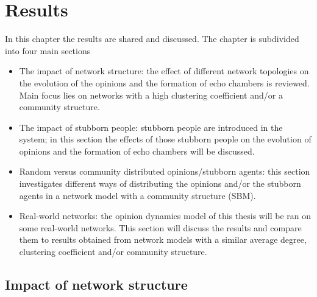 \documentclass[11 pt , letterpaper , twoside , openright]{book}
\begin{document}
\chapter{Results}

In this chapter the results are shared and discussed. The chapter is subdivided into four main sections
\begin{itemize}
	\item The impact of network structure: the effect of different network topologies on the evolution of the opinions and the formation of echo chambers is reviewed. Main focus lies on networks with a high clustering coefficient and/or a community structure.
	\item The impact of stubborn people: stubborn people are introduced in the system; in this section the effects of those stubborn people on the evolution of opinions and the formation of echo chambers will be discussed.
	\item Random versus community distributed opinions/stubborn agents: this section investigates different ways of distributing the opinions and/or the stubborn agents in a network model with a community structure (SBM).
	\item Real-world networks: the opinion dynamics model of this thesis will be ran on some real-world networks. This section will discuss the results and compare them to results obtained from network models with a similar average degree, clustering coefficient and/or community structure.
\end{itemize}

\section{Impact of network structure}
\end{document}
